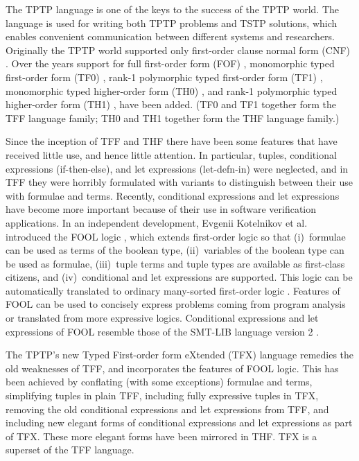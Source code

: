 \documentclass{easychair}
\begin{document}
The TPTP language is one of the keys to the success of the TPTP world.
The language is used for writing both TPTP problems and TSTP solutions,
which enables convenient communication between different systems and
researchers.
Originally the TPTP world supported only first-order clause normal form (CNF)
\cite{SS98-JAR}.
Over the years support for full first-order form (FOF) \cite{Sut09},
monomorphic typed first-order form (TF0) \cite{SS+12}, rank-1 polymorphic
typed first-order form (TF1) \cite{BP13-TFF1}, monomorphic typed higher-order 
form (TH0) \cite{SB10}, and rank-1 polymorphic typed higher-order form (TH1) 
\cite{KSR16}, have been added.
(TF0 and TF1 together form the TFF language family; TH0 and TH1 together form 
the THF language family.)

Since the inception of TFF and THF there have been some features that have 
received little use, and hence little attention. 
In particular, tuples, conditional expressions (if-then-else), and let 
expressions (let-defn-in) were neglected, and in TFF they were horribly 
formulated with variants to distinguish between their use with formulae and 
terms. 
Recently, conditional expressions and let expressions have become more 
important because of their use in software verification applications.
In an independent development, Evgenii Kotelnikov et al. introduced the FOOL 
logic \cite{KKV15}, which extends first-order logic so that (i)~formulae can 
be used as terms of the boolean type, (ii)~variables of the boolean type can 
be used as formulae, (iii)~tuple terms and tuple types are available as 
first-class citizens, and (iv)~conditional and let expressions are supported. 
This logic can be automatically translated to ordinary many-sorted first-order
logic \cite{KKV15}.
Features of FOOL can be used to concisely express problems coming from program
analysis \cite{KKV18} or translated from more expressive logics.
Conditional expressions and let expressions of FOOL resemble those of the 
SMT-LIB language version 2 \cite{BST10}.

The TPTP's new Typed First-order form eXtended (TFX) language remedies the
old weaknesses of TFF, and incorporates the features of FOOL logic.
This has been achieved by conflating (with some exceptions) formulae and 
terms, simplifying tuples in plain TFF, including fully expressive tuples in 
TFX, removing the old conditional expressions and let expressions from 
TFF, and including new elegant forms of conditional expressions and let 
expressions as part of TFX. 
These more elegant forms have been mirrored in THF.
TFX is a superset of the TFF language. 
\end{document}
